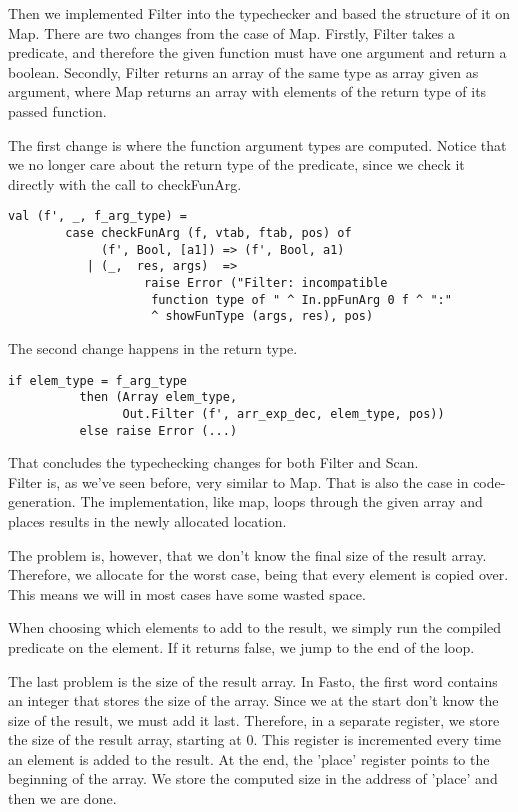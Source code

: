 \documentclass[10pt]{article}
\begin{document}
Then we implemented Filter into the typechecker and based the structure of it on Map. There are two changes from the case of Map. Firstly, Filter takes a predicate, and therefore the given function must have one argument and return a boolean. Secondly, Filter returns an array of the same type as array given as argument, where Map returns an array with elements of the return type of its passed function.

The first change is where the function argument types are computed. Notice that we no longer care about the return type of the predicate, since we check it directly with the call to checkFunArg. 
\begin{Verbatim}[frame=single]
	val (f', _, f_arg_type) =
        case checkFunArg (f, vtab, ftab, pos) of
             (f', Bool, [a1]) => (f', Bool, a1)
           | (_,  res, args)  =>
                   raise Error ("Filter: incompatible
                    function type of " ^ In.ppFunArg 0 f ^ ":" 
                    ^ showFunType (args, res), pos)

\end{Verbatim}
The second change happens in the return type.
\begin{Verbatim}[frame=single]
	if elem_type = f_arg_type
          then (Array elem_type,
                Out.Filter (f', arr_exp_dec, elem_type, pos))
          else raise Error (...)
\end{Verbatim}
That concludes the typechecking changes for both Filter and Scan.\\

Filter is, as we've seen before, very similar to Map. That is also the case in code-generation. The implementation, like map, loops through the given array and places results in the newly allocated location.

The problem is, however, that we don't know the final size of the result array. Therefore, we allocate for the worst case, being that every element is copied over. This means we will in most cases have some wasted space.

When choosing which elements to add to the result, we simply run the compiled predicate on the element. If it returns false, we jump to the end of the loop.

The last problem is the size of the result array. In Fasto, the first word contains an integer that stores the size of the array. Since we at the start don't know the size of the result, we must add it last. Therefore, in a separate register, we store the size of the result array, starting at 0. This register is incremented every time an element is added to the result. At the end, the 'place' register points to the beginning of the array. We store the computed size in the address of 'place' and then we are done.
\end{document}
